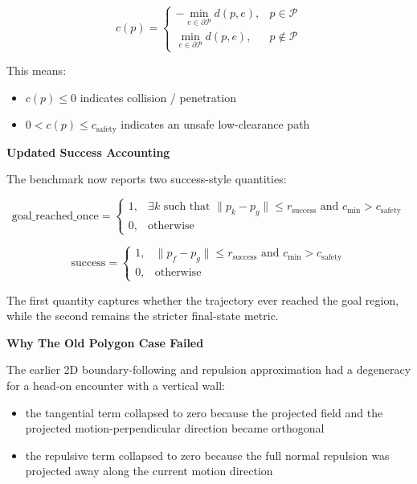 \documentclass[11pt]{article}
\begin{document}
\begin{equation}
c(p) =
\begin{cases}
- \min\limits_{e \in \partial \mathcal{P}} d(p, e), & p \in \mathcal{P} \\
\min\limits_{e \in \partial \mathcal{P}} d(p, e), & p \notin \mathcal{P}
\end{cases}
\end{equation}

This means:

\begin{itemize}[leftmargin=*]
  \item $c(p) \le 0$ indicates collision / penetration
  \item $0 < c(p) \le c_{\text{safety}}$ indicates an unsafe low-clearance path
\end{itemize}

\textbf{Updated Success Accounting}

The benchmark now reports two success-style quantities:

\begin{equation}
\text{goal\_reached\_once} =
\begin{cases}
1, & \exists k \text{ such that } \lVert p_k - p_g \rVert \le r_{\text{success}} \text{ and } c_{\min} > c_{\text{safety}} \\
0, & \text{otherwise}
\end{cases}
\end{equation}

\begin{equation}
\text{success} =
\begin{cases}
1, & \lVert p_f - p_g \rVert \le r_{\text{success}} \text{ and } c_{\min} > c_{\text{safety}} \\
0, & \text{otherwise}
\end{cases}
\end{equation}

The first quantity captures whether the trajectory ever reached the goal region,
while the second remains the stricter final-state metric.

\textbf{Why The Old Polygon Case Failed}

The earlier 2D boundary-following and repulsion approximation had a degeneracy
for a head-on encounter with a vertical wall:

\begin{itemize}[leftmargin=*]
  \item the tangential term collapsed to zero because the projected field and the projected motion-perpendicular direction became orthogonal
  \item the repulsive term collapsed to zero because the full normal repulsion was projected away along the current motion direction
\end{itemize}
\end{document}
